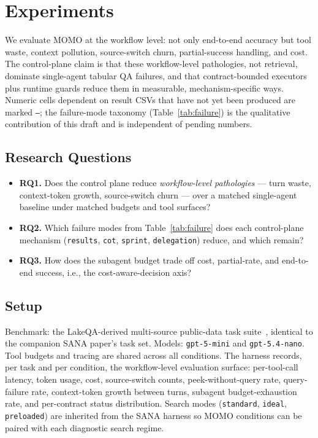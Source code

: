 \section{Experiments}
\label{sec:experiments}

We evaluate MOMO at the workflow level: not only end-to-end accuracy but tool waste, context pollution, source-switch churn, partial-success handling, and cost. The control-plane claim is that these workflow-level pathologies, not retrieval, dominate single-agent tabular QA failures, and that contract-bounded executors plus runtime guards reduce them in measurable, mechanism-specific ways. Numeric cells dependent on result CSVs that have not yet been produced are marked \texttt{--}; the failure-mode taxonomy (Table~\ref{tab:failure}) is the qualitative contribution of this draft and is independent of pending numbers.

\subsection{Research Questions}

\begin{itemize}
\item \textbf{RQ1.} Does the control plane reduce \emph{workflow-level pathologies} --- turn waste, context-token growth, source-switch churn --- over a matched single-agent baseline under matched budgets and tool surfaces?
\item \textbf{RQ2.} Which failure modes from Table~\ref{tab:failure} does each control-plane mechanism (\texttt{results}, \texttt{cot}, \texttt{sprint}, \texttt{delegation}) reduce, and which remain?
\item \textbf{RQ3.} How does the subagent budget trade off cost, partial-rate, and end-to-end success, i.e., the cost-aware-decision axis?
\end{itemize}

\subsection{Setup}

Benchmark: the LakeQA-derived multi-source public-data task suite~\cite{wang2026lakeqa}, identical to the companion SANA paper's task set. Models: \texttt{gpt-5-mini} and \texttt{gpt-5.4-nano}. Tool budgets and tracing are shared across all conditions. The harness records, per task and per condition, the workflow-level evaluation surface: per-tool-call latency, token usage, cost, source-switch counts, peek-without-query rate, query-failure rate, context-token growth between turns, subagent budget-exhaustion rate, and per-contract status distribution. Search modes (\texttt{standard}, \texttt{ideal}, \texttt{preloaded}) are inherited from the SANA harness so MOMO conditions can be paired with each diagnostic search regime.

